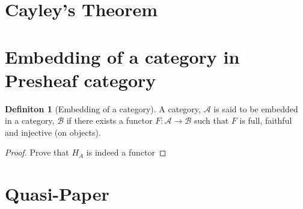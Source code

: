 \documentclass[18pt,a4paper]{extarticle}
\theoremstyle{theorem}
\theoremstyle{definition}
\newtheorem{definition}{Definiton}[section]
\theoremstyle{lemma}
\begin{document}
\section{Cayley's Theorem}%

\section{Embedding of a category in Presheaf category}%

\begin{definition}[Embedding of a category] %
A category, $\mathcal{A}$  is said to be embedded in a category, $\mathcal{B}$ if there exists a
functor $F: \mathcal{A} \to \mathcal{B} $ such that $F$ is full, faithful and injective (on objects).
\end{definition} %

\begin{proof}
	Prove that $H_A$ is indeed a functor

\end{proof}




\section{Quasi-Paper}%
\label{sec:quasi_paper}
\end{document}
